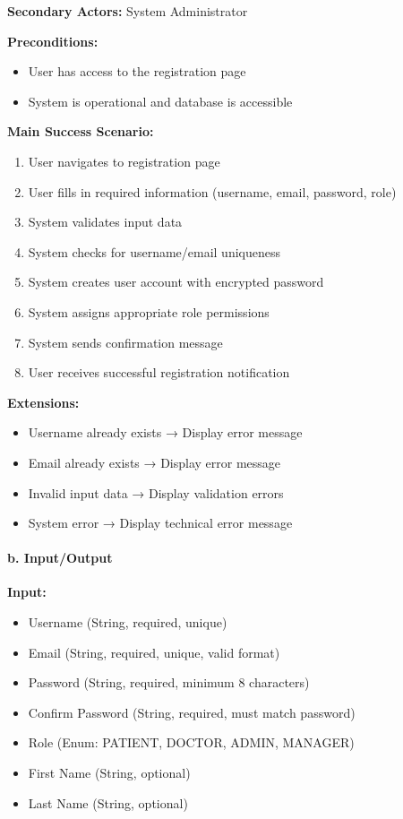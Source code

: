 \documentclass[12pt,a4paper]{article}
\begin{document}
\textbf{Secondary Actors:} System Administrator

\textbf{Preconditions:}
\begin{itemize}
    \item User has access to the registration page
    \item System is operational and database is accessible
\end{itemize}

\textbf{Main Success Scenario:}
\begin{enumerate}
    \item User navigates to registration page
    \item User fills in required information (username, email, password, role)
    \item System validates input data
    \item System checks for username/email uniqueness
    \item System creates user account with encrypted password
    \item System assigns appropriate role permissions
    \item System sends confirmation message
    \item User receives successful registration notification
\end{enumerate}

\textbf{Extensions:}
\begin{itemize}
    \item Username already exists → Display error message
    \item Email already exists → Display error message
    \item Invalid input data → Display validation errors
    \item System error → Display technical error message
\end{itemize}

\paragraph{b. Input/Output}

\textbf{Input:}
\begin{itemize}
    \item Username (String, required, unique)
    \item Email (String, required, unique, valid format)
    \item Password (String, required, minimum 8 characters)
    \item Confirm Password (String, required, must match password)
    \item Role (Enum: PATIENT, DOCTOR, ADMIN, MANAGER)
    \item First Name (String, optional)
    \item Last Name (String, optional)
\end{itemize}
\end{document}
